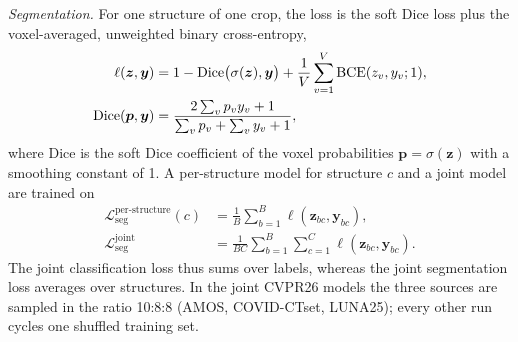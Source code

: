 \emph{Segmentation.} For one structure of one crop, the loss is the soft Dice loss plus the voxel-averaged, unweighted binary cross-entropy,
\begin{align}
\ell(\bm{z}, \bm{y})&=1-\mathrm{Dice}\big(\sigma(\bm{z}), \bm{y}\big)+\frac{1}{V}\sum_{v=1}^{V}\mathrm{BCE}(z_v, y_v; 1), \label{eq:lseg_term}\\
\mathrm{Dice}(\bm{p}, \bm{y})&=\frac{2\sum_{v} p_v y_v+1}{\sum_{v} p_v+\sum_{v} y_v+1}, \notag
\end{align}
where $\mathrm{Dice}$ is the soft Dice coefficient of the voxel probabilities $\bm{p}=\sigma(\bm{z})$ with a smoothing constant of 1. A per-structure model for structure $c$ and a joint model are trained on
\begin{subequations}\label{eq:lseg}
\begin{align}
\mathcal{L}^{\text{per-structure}}_{\text{seg}}(c)&=\frac{1}{B}\sum_{b=1}^{B}\ell(\bm{z}_{bc}, \bm{y}_{bc}), \label{eq:lseg_pt}\\
\mathcal{L}^{\text{joint}}_{\text{seg}}&=\frac{1}{BC}\sum_{b=1}^{B}\sum_{c=1}^{C}\ell(\bm{z}_{bc}, \bm{y}_{bc}). \label{eq:lseg_joint}
\end{align}
\end{subequations}
The joint classification loss thus sums over labels, whereas the joint segmentation loss averages over structures. In the joint CVPR26 models the three sources are sampled in the ratio 10:8:8 (AMOS, COVID-CTset, LUNA25); every other run cycles one shuffled training set.


